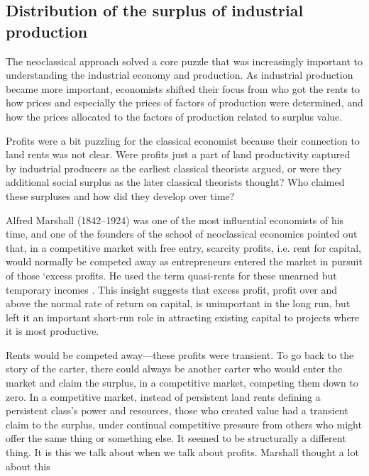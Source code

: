 \subsection{Distribution of the surplus of industrial production}
The neoclassical approach %
solved a core puzzle that was increasingly important to understanding the industrial economy and production. As industrial production became more important,  economists shifted their focus from who got the rents to how prices and especially the prices of factors of production were determined, and how the prices allocated to the factors of production related to surplus value.  

Profits were a bit puzzling for the classical economist because their connection to land rents was not clear. Were profits just a part of land productivity captured by industrial producers as the earliest classical theorists argued, or were they  additional social surplus as the later classical theorists thought? Who claimed these surpluses and how did they develop over time? %

Alfred Marshall (1842--1924) was one of the most influential economists of his time, and one of the founders of the school of neoclassical economics pointed out that, in a competitive market with free entry, scarcity profits, i.e. rent for capital, would normally be competed away  as entrepreneurs entered the market in pursuit of those `excess profits. He used the term \glspl{quasi-rent} for these unearned but temporary incomes \cite{GET-Johnson-rent-econ-theory}.  %
This insight suggests that excess profit, profit over and above the normal rate of return on capital, is unimportant in the long run, but left it an important short-run role in attracting existing capital to projects where it is most productive.

Rents would be competed away---these profits were transient. To go back to the story of the carter, there could always be another carter who would enter the market and claim the surplus, in a competitive market, competing them down to zero. In a competitive market, instead of persistent land rents defining a persistent class's power and resources, those who created value had a transient claim to the surplus, under continual competitive pressure from others who might offer the same thing or something else. It seemed to be structurally a different thing. It is this we talk about when we talk about \glspl{profit}. 
Marshall thought a lot about this 

